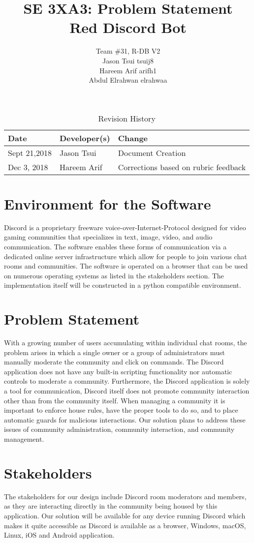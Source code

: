 \documentclass{article}
\title{SE 3XA3: Problem Statement\\Red Discord Bot}
\author{Team \#31, R-DB V2
		\\ Jason Tsui tsuij8
		\\ Hareem Arif arifh1
		\\ Abdul Elrahwan elrahwaa
}
\date{}
\begin{document}
\begin{table}[hp]
\caption{Revision History} \label{TblRevisionHistory}
\begin{tabularx}{\textwidth}{llX}
\toprule
\textbf{Date} & \textbf{Developer(s)} & \textbf{Change}\\
\midrule
Sept 21,2018 & Jason Tsui & Document Creation\\
Dec 3, 2018 & Hareem Arif & Corrections based on rubric feedback\\
\bottomrule
\end{tabularx}
\end{table}

\newpage

\maketitle

\section{Environment for the Software}

Discord is a proprietary freeware voice-over-Internet-Protocol designed for video gaming communities that specializes in text, image, video, and audio communication. The software enables these forms of communication via a dedicated online server infrastructure which allow for people to join various chat rooms and communities. The software is operated on a browser that can be used on numerous operating systems as listed in the stakeholders section. The implementation itself will be constructed in a python compatible environment.
\section{Problem Statement}

With a growing number of users accumulating within individual chat rooms, the problem arises in which a single owner or a group of administrators must manually moderate the community and click on commands. The Discord application does not have any built-in scripting functionality nor automatic controls to moderate a community. Furthermore, the Discord application is solely a tool for communication, Discord itself does not promote community interaction other than from the community itself. When managing a community it is important to enforce house rules, have the proper tools to do so, and to place automatic guards for malicious interactions. Our solution plans to address these issues of community administration, community interaction, and community management.
\section{Stakeholders}

The stakeholders for our design include Discord room moderators and members, as they are interacting directly in the community being housed by this application. Our solution will be available for any device running Discord which makes it quite accessible as Discord is available as a browser, Windows, macOS, Linux, iOS and Android application.
\end{document}

